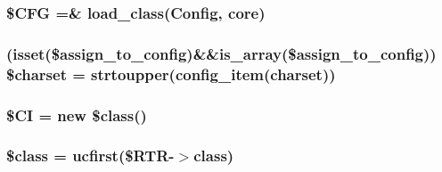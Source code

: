 \subsubsection[{\$\+C\+F\+G}]{\setlength{\rightskip}{0pt plus 5cm}\$C\+F\+G =\& load\+\_\+class(\textquotesingle{}Config\textquotesingle{}, \textquotesingle{}core\textquotesingle{})}\label{system_2core_2_code_igniter_8php_adb9373e11e42b2cd55d1fe249ae72deb}
\hypertarget{system_2core_2_code_igniter_8php_acf3a97185c56fefd63af2d2af8676bd9}{}
\subsubsection[{\$charset}]{ (isset(\$assign\+\_\+to\+\_\+config)\&\&is\+\_\+array(\$assign\+\_\+to\+\_\+config)) \$charset = strtoupper(config\+\_\+item(\textquotesingle{}charset\textquotesingle{}))}\label{system_2core_2_code_igniter_8php_acf3a97185c56fefd63af2d2af8676bd9}
\hypertarget{system_2core_2_code_igniter_8php_ae0314d046ddf7fcfaec03222977427d3}{}
\subsubsection[{\$\+C\+I}]{\setlength{\rightskip}{0pt plus 5cm}\$C\+I = new \$class()}\label{system_2core_2_code_igniter_8php_ae0314d046ddf7fcfaec03222977427d3}
\hypertarget{system_2core_2_code_igniter_8php_a252ba022809910ea710a068fc1bab657}{}
\subsubsection[{\$class}]{\setlength{\rightskip}{0pt plus 5cm}\$class = ucfirst(\$R\+T\+R-\/$>$class)}\label{system_2core_2_code_igniter_8php_a252ba022809910ea710a068fc1bab657}
\hypertarget{system_2core_2_code_igniter_8php_a20b89fa011927fc498a4a665fa44d061}{}
